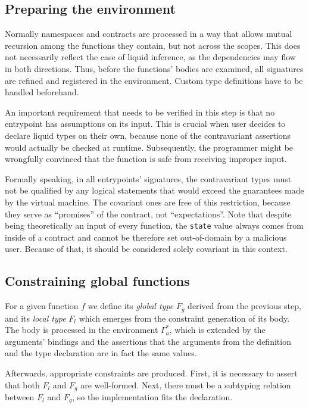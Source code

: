 \subsection{Preparing the environment}

Normally namespaces and contracts are processed in a way that allows mutual
recursion among the functions they contain, but not across the scopes. This does
not necessarily reflect the case of liquid inference, as the dependencies may
flow in both directions. Thus, before the functions' bodies are examined, all
signatures are refined and registered in the environment. Custom type
definitions have to be handled beforehand.

An important requirement that needs to be verified in this step is that no
entrypoint has assumptions on its input. This is crucial when user decides to
declare liquid types on their own, because none of the contravariant assertions
would actually be checked at runtime. Subsequently, the programmer might be
wrongfully convinced that the function is safe from receiving improper input.

Formally speaking, in all entrypoints' signatures, the contravariant types must
not be qualified by any logical statements that would exceed the guarantees made
by the virtual machine. The covariant ones are free of this restriction, because
they serve as ``promises'' of the contract, not ``expectations''. Note that
despite being theoretically an input of every function, the \texttt{state} value
always comes from inside of a contract and cannot be therefore set out-of-domain
by a malicious user. Because of that, it should be considered solely covariant
in this context.

\subsection{Constraining global functions}

For a given function $f$ we define its \emph{global type} $F_g$ derived from the
previous step, and its \emph{local type} $F_l$ which emerges from the constraint
generation of its body. The body is processed in the environment $\Gamma^*_a$,
which is extended by the arguments' bindings and the assertions that the
arguments from the definition and the type declaration are in fact the same
values.

Afterwards, appropriate constraints are produced. First, it is necessary to
assert that both $F_l$ and $F_g$ are well-formed. Next, there must be a
subtyping relation between $F_l$ and $F_g$, so the implementation fits the
declaration.

